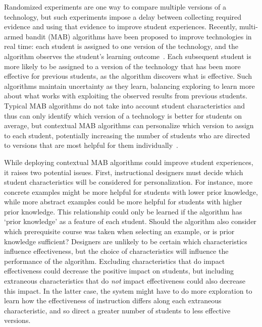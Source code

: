Randomized experiments are one way to compare multiple versions of a technology, but such experiments impose a delay between collecting required evidence and using that evidence to improve student experiences. Recently, multi-armed bandit (MAB) algorithms have been proposed to improve technologies in real time: each student is assigned to one version of the technology, and the algorithm observes the student's learning outcome~\cite{liu2014trading,williams2018enhancing}. Each subsequent student is more likely to be assigned to a version of the technology that has been more effective for previous students, as the algorithm discovers what is effective. Such algorithms maintain uncertainty as they learn, balancing exploring to learn more about what works with exploiting the observed results from previous students.
Typical MAB algorithms do not take into account student characteristics and thus can only identify which version of a technology is better for students on average, but contextual MAB algorithms can personalize which version to assign to each student, potentially increasing the number of students who are directed to versions that are most helpful for them individually~\cite{shaikh2019balancing}. 

While deploying contextual MAB algorithms could improve student experiences, it raises two potential issues. First, instructional designers must decide which student characteristics will be considered for personalization.
For instance, more concrete examples might be more helpful for students with lower prior knowledge, while more abstract examples could be more helpful for students with higher prior knowledge. This relationship could only be learned if the algorithm has `prior knowledge' as a feature of each student. Should the algorithm also consider which prerequisite course was taken when selecting an example, or is prior knowledge sufficient? Designers are unlikely to be certain which characteristics influence effectiveness, but the choice of characteristics will influence the performance of the algorithm. Excluding characteristics that do impact effectiveness could decrease the positive impact on students, but including extraneous characteristics that do \textit{not} impact effectiveness could also decrease this impact. 
In the latter case, the system might have to do more exploration to learn how the effectiveness of instruction differs along each extraneous characteristic, and so direct a greater number of students to less effective versions.


